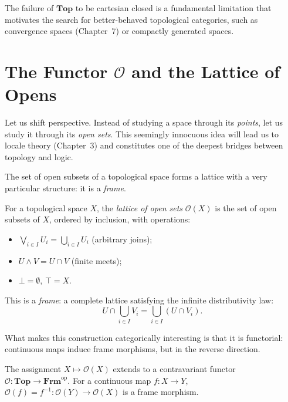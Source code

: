 \begin{warning}
The failure of $\mathbf{Top}$ to be cartesian closed is a fundamental limitation that
motivates the search for better-behaved topological categories, such as convergence spaces
(Chapter~7) or compactly generated spaces.
\end{warning}

\section{The Functor $\mathcal{O}$ and the Lattice of Opens}

Let us shift perspective. Instead of studying a space through its
\emph{points}, let us study it through its \emph{open sets}. This seemingly
innocuous idea will lead us to locale theory (Chapter~3) and constitutes one
of the deepest bridges between topology and logic.

The set of open subsets of a topological space forms a lattice with a very
particular structure: it is a \emph{frame}.

\begin{definition}
For a topological space $X$, the \emph{lattice of open sets} $\mathcal{O}(X)$ is the set
of open subsets of $X$, ordered by inclusion, with operations:
\begin{itemize}
  \item $\bigvee_{i\in I} U_i = \bigcup_{i\in I} U_i$ (arbitrary joins);
  \item $U \wedge V = U \cap V$ (finite meets);
  \item $\bot = \emptyset$, $\top = X$.
\end{itemize}
This is a \emph{frame}: a complete lattice satisfying the infinite distributivity law:
\[
  U \cap \bigcup_{i\in I} V_i = \bigcup_{i\in I}(U \cap V_i).
\]
\end{definition}

What makes this construction categorically interesting is that it is
functorial: continuous maps induce frame morphisms, but in the reverse
direction.

\begin{proposition}
The assignment $X \mapsto \mathcal{O}(X)$ extends to a contravariant functor
$\mathcal{O}\colon \mathbf{Top} \to \mathbf{Frm}^{\mathrm{op}}$.
For a continuous map $f\colon X \to Y$,
$\mathcal{O}(f) = f^{-1}\colon \mathcal{O}(Y) \to \mathcal{O}(X)$ is a frame morphism.
\end{proposition}

